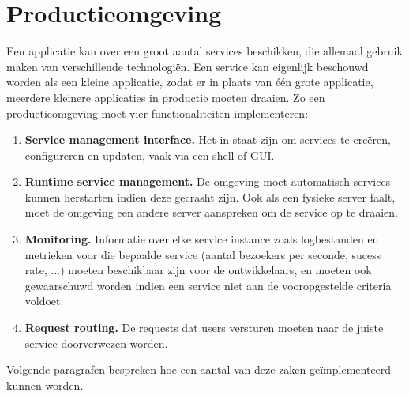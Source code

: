 \documentclass{report}
\begin{document}
	\chapter{Productieomgeving}
	Een applicatie kan over een groot aantal services beschikken, die allemaal gebruik maken van verschillende technologiën. Een service kan eigenlijk beschouwd worden als een kleine applicatie, zodat er in plaats van één grote applicatie, meerdere kleinere applicaties in productie moeten draaien. Zo een productieomgeving moet vier functionaliteiten implementeren:
	\begin{enumerate}
		\item \textbf{Service management interface.} Het in staat zijn om services te creëren, configureren en updaten, vaak via een shell of GUI.
		\item \textbf{Runtime service management.} De omgeving moet automatisch services kunnen herstarten indien deze gecrasht zijn. Ook als een fysieke server faalt, moet de omgeving een andere server aanspreken om de service op te draaien.
		\item \textbf{Monitoring.} Informatie over elke service instance zoals logbestanden en metrieken voor die bepaalde service (aantal bezoekers per seconde, sucess rate, ...) moeten beschikbaar zijn voor de ontwikkelaars, en moeten ook gewaarschuwd worden indien een service niet aan de vooropgestelde criteria voldoet.  
		\item \textbf{Request routing.} De requests dat users versturen moeten naar de juiste service doorverwezen worden.
	\end{enumerate}

	Volgende paragrafen bespreken hoe een aantal van deze zaken geïmplementeerd kunnen worden.
\end{document}
